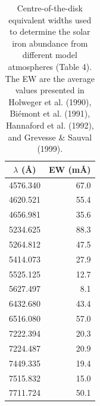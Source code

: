 \documentclass[traditabstract]{aa} %
\begin{document}
\begin{table}
\caption{Centre-of-the-disk equivalent widths used to determine
the solar iron abundance from different model atmospheres (Table 4).
The EW are the average values presented in Holweger et al. (1990),
Bi\'emont et al. (1991), Hannaford et al. (1992), and Grevesse \& Sauval (1999).}
\label{ewfe2}
\centering 
\renewcommand{\footnoterule}{}  %
\begin{tabular}{cr} 
\hline\hline                
\scriptsize
{$\lambda$ (\AA)}  & EW (m\AA)    \\
\hline    
   4576.340  &  67.0 \\
   4620.521  &  55.4 \\
   4656.981  &  35.6 \\
   5234.625  &  88.3 \\
   5264.812  &  47.5 \\
   5414.073  &  27.9 \\
   5525.125  &  12.7 \\
   5627.497  &   8.1 \\
   6432.680  &  43.4 \\
   6516.080  &  57.0 \\
   7222.394  &  20.3 \\
   7224.487  &  20.9 \\
   7449.335  &  19.4 \\
   7515.832  &  15.0 \\
   7711.724  &  50.1 \\
\hline                                 
\hline                                 
\end{tabular}
\end{table}
\end{document}

